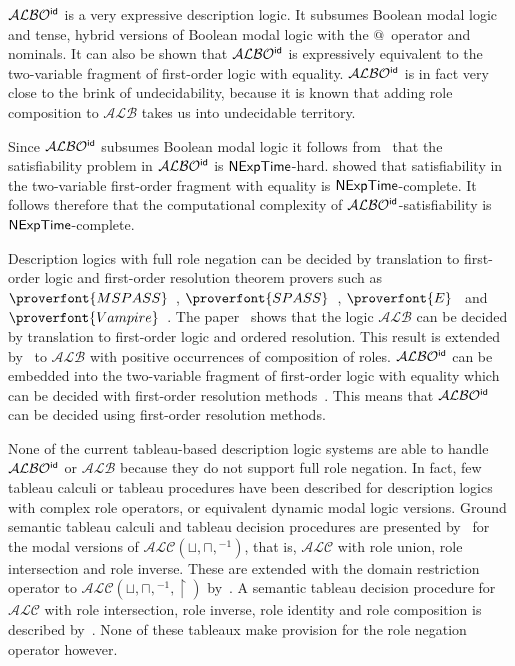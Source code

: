 \documentclass[leqno
,pdflatex
,prodmode
,acmtocl
]{acmsmall}
\newcommand{\mathcmd}[1]{\ensuremath{#1}\xspace}
\newcommand{\dlfont}{\mathcal}
\newcommand{\dl}[1]{\mathcmd{\dlfont{#1}}}
\newcommand{\idRole}{\mathcmd{\textsf{\upshape\mdseries id}}}
\newcommand{\ALBOid}{\dl{ALBO\smash[t]{\mbox{${}^{\idRole}$}}}}
\newcommand{\ALC}{\dl{ALC}}
\def\And{\sqcap}
\newcommand{\ALB}{\dl{ALB}}
\def\Or{\sqcup}
\def\complexityfont{\sffamily\upshape}
\def\complexity#1{\mathcmd{\text{\complexityfont #1}}}
\def\NExpTime{\complexity{NExpTime}}
\newcommand{\spass}{\mathcmd{\proverfont{SPASS}}}
\newcommand{\mspass}{\mathcmd{\proverfont{MSPASS}}}
\newcommand{\vampire}{\mathcmd{\proverfont{Vampire}}}
\newcommand{\E}{\mathcmd{\proverfont{E}}}
\newcommand{\DomR}{{\upharpoonright}}
\begin{document}
\ALBOid is a very expressive description logic.
It subsumes Boolean modal
logic~\cite{GargovPassy90,GargovPassyTinchev87} and tense, hybrid
versions of Boolean modal logic with the $@$~operator and
nominals.
It can also be shown that \ALBOid is expressively
equivalent to the two-variable fragment of first-order
logic with equality. \ALBOid is in fact very close to the brink of undecidability, because
it is known that adding role composition to \ALB
takes us into undecidable territory.

Since \ALBOid subsumes Boolean modal logic it follows
from~ that the satisfiability problem in \ALBOid
is \NExpTime-hard.
 showed that satisfiability in the
two-variable first-order fragment with equality is \NExpTime-complete.
It follows therefore that the computational complexity of
\ALBOid-satisfiability is \NExpTime-complete.

Description logics with full role negation can
be decided by translation to first-order logic and first-order
resolution theorem provers such as \mspass~\cite{HustadtSchmidtWeidenbach99}, 
\spass~\cite{WeidenbachSchmidtEtAl07}, \E~\cite{Schulz02} and
\vampire~\cite{RiazanovVoronkov99}.
The paper~\cite{HustadtSchmidt00a} shows that the logic \ALB can be
decided by translation to first-order logic and ordered resolution.
This result is extended by~ to \ALB
with positive occurrences of composition of roles.
\ALBOid can be embedded into the two-variable fragment of first-order
logic with equality which can be decided with first-order resolution
methods~\cite{DeNivellePrattHartmann01}.
This means that \ALBOid can be decided using first-order
resolution methods.

None of the current tableau-based description
logic systems are able to handle \ALBOid or \ALB because they
do not support full role negation.
In fact, few tableau calculi or tableau procedures have been described for
description logics with complex role operators, or equivalent dynamic
modal logic versions.
Ground semantic tableau calculi and tableau decision procedures
are presented by~ for the modal
versions of $\ALC(\Or,\And,{}^{-1})$, that is, \ALC with role union, role
intersection and role inverse. These are extended with the domain restriction
operator to $\ALC(\Or,\And,{}^{-1}, \DomR)$ by~.
A semantic tableau decision procedure for \ALC with role intersection,
role inverse, role identity and role composition is described
by~.
None of these tableaux make provision for the role negation operator however.
\end{document}
